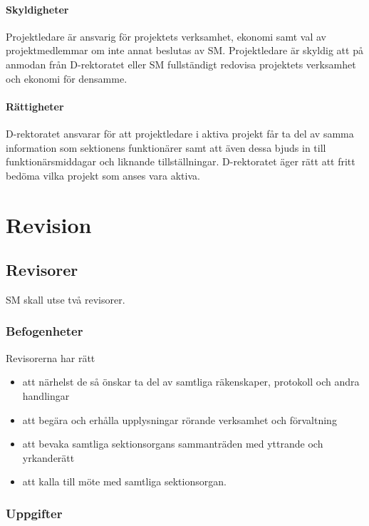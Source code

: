 \documentclass{dgovdoc}
\begin{document}
\paragraph{Skyldigheter}

Projektledare är ansvarig för projektets verksamhet, ekonomi samt
val av projektmedlemmar om inte annat beslutas av SM. Projektledare är
skyldig att på anmodan från D-rektoratet eller SM fullständigt redovisa
projektets verksamhet och ekonomi för densamme.

\paragraph{Rättigheter}

D-rektoratet ansvarar för att projektledare i aktiva projekt får ta del av
samma information som sektionens funktionärer samt att även dessa bjuds
in till funktionärsmiddagar och liknande tillställningar. D-rektoratet äger
rätt att fritt bedöma vilka projekt som anses vara aktiva.

\section{Revision}

\subsection{Revisorer}
\label{sec:revisorer}

SM skall utse två revisorer.

\subsubsection{Befogenheter}

Revisorerna har rätt

\begin{itemize}
  \item att närhelst de så önskar ta del av samtliga räkenskaper, protokoll och
    andra handlingar
  \item att begära och erhålla upplysningar rörande verksamhet och förvaltning
  \item att bevaka samtliga sektionsorgans sammanträden med yttrande och
    yrkanderätt
  \item att kalla till möte med samtliga sektionsorgan.
\end{itemize}

\subsubsection{Uppgifter}
\end{document}
